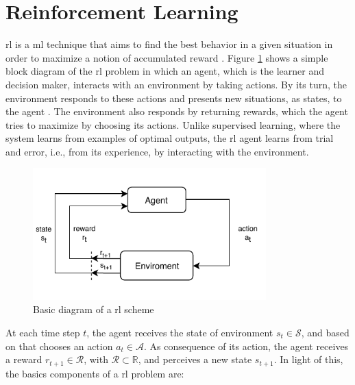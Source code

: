 \section{Reinforcement Learning }
\label{sec:rl-theory}
\Gls{rl} is a \gls{ml} technique that aims to find the best behavior in a given situation in order to maximize a notion of accumulated reward \cite{Bishop07}.
%
Figure \ref{fig:rlbasic} shows a simple block diagram of the \gls{rl} problem in which an agent, which is the learner and decision maker, interacts with an environment by taking actions.
%
By its turn, the environment responds to these actions and presents new situations, as states, to the agent \cite{sutton2018rl}.
%
The environment also responds by returning rewards, which the agent tries to maximize by choosing its actions.
%
Unlike supervised learning, where the system learns from examples of optimal outputs, the \gls{rl} agent learns from trial and error, i.e., from its experience, by interacting with the environment.

\begin{figure}[htbp]
\centerline{\includegraphics[width=90mm]{figures/chp_theory/rl-model.pdf}}
\caption{Basic diagram of a \gls{rl} scheme}
\label{fig:rlbasic}
\end{figure}

At each time step $t$, the agent receives the state of environment $s_t \in \mathcal{S}$, and based on that chooses an action $a_t \in \mathcal{A}$.
%
As consequence of its action, the agent receives a reward $r_{t+1} \in \mathcal{R} $, with $\mathcal{R} \subset \mathbb{R}$, and perceives a new state $s_{t+1}$.
%
In light of this, the basics components of a \gls{rl} problem are:

